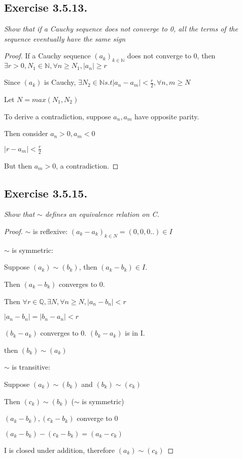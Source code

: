 \documentclass[12pt, a4paper]{article}
\begin{document}
    \subsection*{Exercise 3.5.13.}
    \textit {Show that if a Cauchy sequence does not converge to 0, all the terms of the sequence eventually have the same sign}
        \begin{proof}
            If a Cauchy sequence $(a_k)_{k \in \mathbb{N}}$ does not converge to 0, then $\exists r > 0, N_1 \in \mathbb{N}, \forall n \ge N_1, |a_n| \ge r$

            Since $(a_k)$ is Cauchy, $\exists N_2 \in \mathbb{N} s.t |a_n-a_m| < \frac{r}{2}, \forall n,m \ge N$

            Let $ N = max(N_1, N_2)$

            To derive a contradiction, suppose $a_n, a_m$ have opposite parity. 

            Then consider $a_n >0, a_m < 0$ 
            
            $|r-a_m| < \frac{r}{2}$

            But then $a_m > 0$, a contradiction. 

        \end{proof}
    \subsection*{Exercise 3.5.15.}
    \textit{Show that $\sim$ defines an equivalence relation on C.}
        \begin{proof}
            $\sim$ is reflexive: $(a_k-a_k)_{k\in N} = (0,0,0..) \in I$

            $\sim$ is symmetric: 
            
            Suppose $(a_k)\sim (b_k)$, then $(a_k-b_k) \in I.$

            Then $(a_k-b_k)$ converges to 0. 

            Then $\forall r \in \mathbb{Q}, \exists N, \forall n \ge N, |a_n-b_n| < r$

            $|a_n-b_n| = |b_n-a_n| < r$

            $(b_k-a_k)$ converges to 0. $(b_k-a_k)$ is in I. 

            then $(b_k) \sim (a_k)$


            $\sim$ is transitive: 

            Suppose $(a_k) \sim (b_k)$ and $(b_k) \sim (c_k)$

            Then $(c_k) \sim (b_k)$ ($\sim$ is symmetric)

            $(a_k - b_k) , (c_k - b_k)$ converge to 0

            $(a_k - b_k) - (c_k - b_k) = (a_k - c_k)$

            I is closed under addition, therefore $(a_k) \sim (c_k)$

        \end{proof}
    \pagebreak
\end{document}
